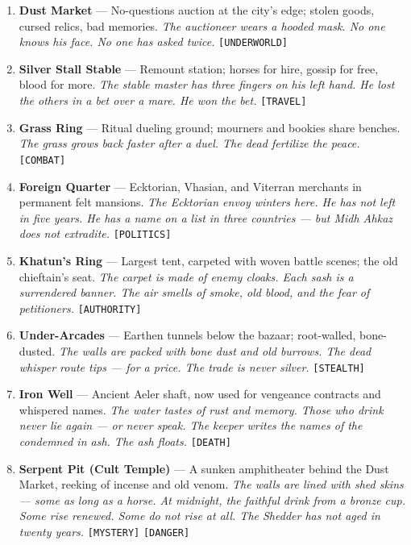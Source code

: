 {{\begin{enumerate}
\item {} \textbf{Dust Market} --- No-questions auction at the city's edge; stolen goods, cursed relics, bad memories. \hfill \textit{The auctioneer wears a hooded mask. No one knows his face. No one has asked twice.} \texttt{[UNDERWORLD]}
\item {} \textbf{Silver Stall Stable} --- Remount station; horses for hire, gossip for free, blood for more. \hfill \textit{The stable master has three fingers on his left hand. He lost the others in a bet over a mare. He won the bet.} \texttt{[TRAVEL]}
\item {} \textbf{Grass Ring} --- Ritual dueling ground; mourners and bookies share benches. \hfill \textit{The grass grows back faster after a duel. The dead fertilize the peace.} \texttt{[COMBAT]}
\item {} \textbf{Foreign Quarter} --- Ecktorian, Vhasian, and Viterran merchants in permanent felt mansions. \hfill \textit{The Ecktorian envoy winters here. He has not left in five years. He has a name on a list in three countries --- but Midh Ahkaz does not extradite.} \texttt{[POLITICS]}
\item {} \textbf{Khatun's Ring} --- Largest tent, carpeted with woven battle scenes; the old chieftain's seat. \hfill \textit{The carpet is made of enemy cloaks. Each sash is a surrendered banner. The air smells of smoke, old blood, and the fear of petitioners.} \texttt{[AUTHORITY]}
\item {} \textbf{Under-Arcades} --- Earthen tunnels below the bazaar; root-walled, bone-dusted. \hfill \textit{The walls are packed with bone dust and old burrows. The dead whisper route tips --- for a price. The trade is never silver.} \texttt{[STEALTH]}
\item {} \textbf{Iron Well} --- Ancient Aeler shaft, now used for vengeance contracts and whispered names. \hfill \textit{The water tastes of rust and memory. Those who drink never lie again --- or never speak. The keeper writes the names of the condemned in ash. The ash floats.} \texttt{[DEATH]}
\item {} \textbf{Serpent Pit (Cult Temple)} --- A sunken amphitheater behind the Dust Market, reeking of incense and old venom. \hfill \textit{The walls are lined with shed skins --- some as long as a horse. At midnight, the faithful drink from a bronze cup. Some rise renewed. Some do not rise at all. The Shedder has not aged in twenty years.} \texttt{[MYSTERY]} \texttt{[DANGER]}
\end{enumerate}

}}

